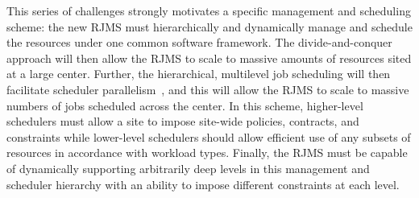 This series of challenges strongly motivates 
a specific management and scheduling scheme:
the new RJMS must hierarchically and dynamically
manage and schedule the resources under one
common software framework. The divide-and-conquer
approach will then allow the RJMS to scale to massive
amounts of resources sited at a large center.  
Further, the hierarchical, multilevel job scheduling
will then facilitate scheduler parallelism~\cite{Omega,Mesos},
and this will allow the RJMS to scale to massive numbers
of jobs scheduled across the center.
In this scheme, higher-level schedulers
must allow a site to impose site-wide policies, contracts,
and constraints while lower-level schedulers should allow
efficient use of any subsets of resources in accordance with
workload types.
Finally, the RJMS must be capable of dynamically supporting
arbitrarily deep levels in this management and scheduler 
hierarchy with an ability to impose
different constraints at each level.


